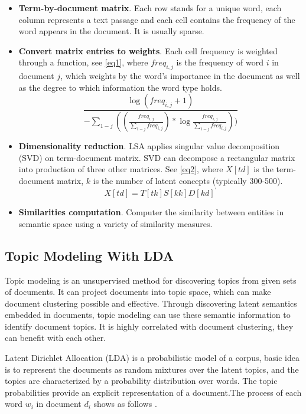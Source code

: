 \documentclass[12pt]{article}
\begin{document}
\begin{itemize}
	\item \textbf{Term-by-document matrix}. Each row stands for a unique word, each column represents a text passage and each cell contains the frequency of the word appears in the document. It is usually sparse.  
	\item \textbf{Convert matrix entries to weights}.  Each cell frequency is weighted through a function, see \eqref{eq1}, where $freq_{i,j}$ is the frequency of word $i$ in document $j$, which weights by the word's importance in the document as well as the degree to which information the word type holds.
	\begin{equation}
	\frac{\log (freq_{i,j} + 1)}{-\sum_{1-j}^{}((\frac{freq_{i,j}}{\sum_{1-j}freq_{i,j}})* \log \frac{freq_{i,j}}{\sum_{1-j}freq_{i,j}}))}
	\label{eq1}
	\end{equation}
	\item \textbf{Dimensionality reduction}. LSA applies singular value decomposition (SVD) on term-document matrix. SVD can decompose a rectangular matrix into production of three other matrices.
	See \eqref{eq2}, where $X[td]$ is the term-document matrix, $k$ is the number of latent concepts (typically 300-500).
	\begin{equation}
	X[td] = T[tk]S[kk]D[kd]^\prime
	\label{eq2}
	\end{equation}
	\item \textbf{Similarities computation}. Computer the similarity between entities in semantic space using a variety of similarity measures.
	
\end{itemize}

\subsection{Topic Modeling With LDA}	
\par
Topic modeling is an unsupervised method for discovering topics from given sets of documents. It can project documents into topic space, which can make document clustering possible and effective. Through discovering latent semantics embedded in documents, topic modeling can use these semantic information to identify document topics. It is highly correlated with document clustering, they can benefit with each other.
\par 
Latent Dirichlet Allocation (LDA) is a probabilistic model of a corpus, basic idea is to represent the documents as random mixtures over the latent topics, and the topics are characterized by a probability distribution over words. The topic probabilities provide an explicit representation of a document.The process of each word $w_i$ in document $d_i$ shows as follows \cite{lda}.
\end{document}
